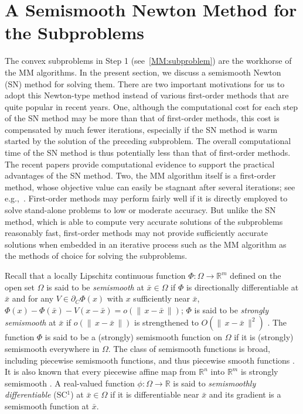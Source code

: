 \documentclass{siamart}
\begin{document}
\section{A Semismooth Newton Method for the Subproblems}
\label{sec: subproblem}
The convex subproblems in Step 1 (see~\eqref{MM:subproblem}) are the workhorse of the MM algorithms. In the present section,
we discuss a semismooth Newton (SN) method for solving them.  There are two important motivations
for us to adopt this Newton-type method instead of various first-order methods that are quite popular in recent years.
One, although the computational cost for each step of the SN method may be more than that of first-order methods,
this cost is compensated by much fewer iterations, especially if the SN method is warm started by the solution of
the preceding subproblem.  The overall computational time of the SN method is thus potentially less than that of first-order methods.
The recent papers
\cite{QiSun2006,ZhaoSunToh2010,MilzarekUlbrich2014,YangSunToh2015,LiSunToh17} provide computational evidence to support the practical advantages of the SN method.
Two, the MM algorithm itself is a first-order method,
whose objective value can easily be stagnant after several iterations; see e.g.,~\cite[Chapter 1]{Lange16}.
First-order methods may perform fairly well if it is directly employed to solve stand-alone problems to low or moderate accuracy.  But unlike the SN method, which is able to compute very accurate solutions of the subproblems reasonably fast, first-order methods may not provide sufficiently accurate solutions when embedded in an iterative process such as
the MM algorithm as the methods of choice for solving the subproblems.


Recall that a locally Lipschitz continuous  function $\Phi: \Omega\to \mathbb{R}^m$  defined on the open set $\Omega$ is said to be
{\sl semismooth} at $\bar{x} \in \Omega$ if $\Phi$ is directionally differentiable at $\bar{x}$ and
for any $V \in \partial_C \Phi(x)$
with $x$ sufficiently near $\bar{x}$, $\Phi(x) - \Phi(\bar{x}) - {V} (x-\bar{x}) = o(\|\,x-\bar{x}\,\|)$;
$\Phi$ is said to be {\sl strongly semismooth} at $\bar{x}$ if $o(\|\,x-\bar{x}\,\|)$ is strengthened to
$O(\|\,x - \bar{x}\,\|^2)$ \cite{Mifflin1977,QiSun1993}.
The function $\Phi$ is said to be a (strongly) semismooth  function on $\Omega$ if it is (strongly) semismooth
everywhere in $\Omega$.  The class of semismooth functions is broad, including piecewise semismooth functions, and thus piecewise smooth functions \cite[Proposition 7.4.6]{FacchineiPang2003}.
It is also known that every piecewise affine map from $\mathbb{R}^n$ into $\mathbb{R}^m$ is strongly
semismooth \cite[Proposition 7.4.7]{FacchineiPang2003}.  A real-valued function $\phi : \Omega \to \mathbb{R}$ is
said to {\sl semismoothly differentiable} (SC$^1$) at $\bar{x} \in \Omega$ \cite[Subsections~7.4.1 and 8.3.3]{FacchineiPang2003}
if it is differentiable near $\bar{x}$ and its gradient is a semismooth function at $\bar{x}$.
\end{document}
